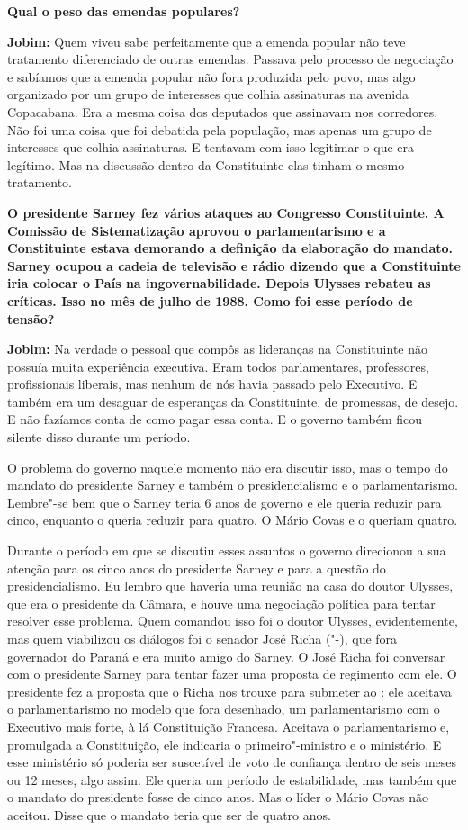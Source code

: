 \textbf{Qual o peso das emendas populares?}

\textbf{Jobim:} Quem viveu sabe perfeitamente que a emenda popular não
teve tratamento diferenciado de outras emendas. Passava pelo processo de
negociação e sabíamos que a emenda popular não fora produzida pelo povo,
mas algo organizado por um grupo de interesses que colhia assinaturas na
avenida Copacabana. Era a mesma coisa dos deputados que assinavam nos
corredores. Não foi uma coisa que foi debatida pela população, mas
apenas um grupo de interesses que colhia assinaturas. E tentavam com
isso legitimar o que era legítimo. Mas na discussão dentro da
Constituinte elas tinham o mesmo tratamento.

\textbf{O presidente Sarney fez vários ataques ao Congresso
Constituinte. A Comissão de Sistematização aprovou o parlamentarismo e a
Constituinte estava demorando a definição da elaboração do mandato.
Sarney ocupou a cadeia de televisão e rádio dizendo que a Constituinte
iria colocar o País na ingovernabilidade. Depois Ulysses rebateu as
críticas. Isso no mês de julho de 1988. Como foi esse período de
tensão?}

\textbf{Jobim:} Na verdade o pessoal que compôs as lideranças na
Constituinte não possuía muita experiência executiva. Eram todos
parlamentares, professores, profissionais liberais, mas nenhum de nós
havia passado pelo Executivo. E também era um desaguar de esperanças da
Constituinte, de promessas, de desejo. E não fazíamos conta de como
pagar essa conta. E o governo também ficou silente disso durante um
período.

O problema do governo naquele momento não era discutir isso, mas o tempo
do mandato do presidente Sarney e também o presidencialismo e o
parlamentarismo. Lembre"-se bem que o Sarney teria 6 anos de governo e
ele queria reduzir para cinco, enquanto o  queria reduzir para
quatro. O Mário Covas e o  queriam quatro.

Durante o período em que se discutiu esses assuntos o governo direcionou
a sua atenção para os cinco anos do presidente Sarney e para a questão
do presidencialismo. Eu lembro que haveria uma reunião na casa do doutor
Ulysses, que era o presidente da Câmara, e houve uma negociação política
para tentar resolver esse problema. Quem comandou isso foi o doutor
Ulysses, evidentemente, mas quem viabilizou os diálogos foi o senador
José Richa ("-), que fora governador do Paraná e era muito amigo do
Sarney. O José Richa foi conversar com o presidente Sarney para tentar
fazer uma proposta de regimento com ele. O presidente fez a proposta que
o Richa nos trouxe para submeter ao : ele aceitava o parlamentarismo
no modelo que fora desenhado, um parlamentarismo com o Executivo mais
forte, à lá Constituição Francesa. Aceitava o parlamentarismo e,
promulgada a Constituição, ele indicaria o primeiro"-ministro e o
ministério. E esse ministério só poderia ser suscetível de voto de
confiança dentro de seis meses ou 12 meses, algo assim. Ele queria um
período de estabilidade, mas também que o mandato do presidente fosse de
cinco anos. Mas o líder o Mário Covas não aceitou. Disse que o mandato
teria que ser de quatro anos.

